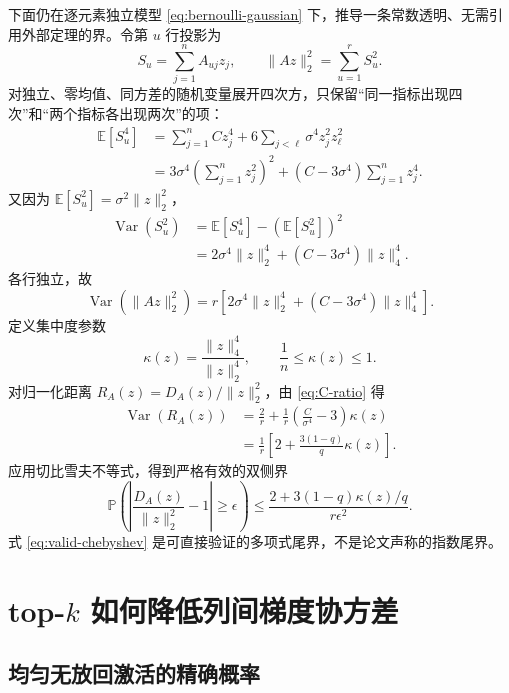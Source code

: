 \documentclass[11pt]{article}
\numberwithin{equation}{section}
\newcommand{\E}{\mathbb{E}}
\newcommand{\Pp}{\mathbb{P}}
\newcommand{\1}{\mathbf{1}}
\newcommand{\Var}{\operatorname{Var}}
\begin{document}
下面仍在逐元素独立模型 \eqref{eq:bernoulli-gaussian} 下，推导一条常数透明、无需引用外部定理的界。令第 $u$ 行投影为
\begin{equation}
  S_u=\sum_{j=1}^{n}A_{uj}z_j,
  \qquad
  \|Az\|_2^2=\sum_{u=1}^{r}S_u^2.
\end{equation}
对独立、零均值、同方差的随机变量展开四次方，只保留“同一指标出现四次”和“两个指标各出现两次”的项：
\begin{align}
  \E[S_u^4]
  &=\sum_{j=1}^{n}Cz_j^4
    +6\sum_{j<\ell}\sigma^4z_j^2z_\ell^2\\
  &=3\sigma^4\left(\sum_{j=1}^{n}z_j^2\right)^2
    +(C-3\sigma^4)\sum_{j=1}^{n}z_j^4.
  \label{eq:row-fourth}
\end{align}
又因为 $\E[S_u^2]=\sigma^2\|z\|_2^2$，
\begin{align}
  \Var(S_u^2)
  &=\E[S_u^4]-(\E[S_u^2])^2\\
  &=2\sigma^4\|z\|_2^4
   +(C-3\sigma^4)\|z\|_4^4.
\end{align}
各行独立，故
\begin{equation}
  \Var(\|Az\|_2^2)
  =r\left[
    2\sigma^4\|z\|_2^4
    +(C-3\sigma^4)\|z\|_4^4
  \right].
\end{equation}
定义集中度参数
\begin{equation}
  \kappa(z)=\frac{\|z\|_4^4}{\|z\|_2^4},
  \qquad
  \frac1n\le\kappa(z)\le1.
\end{equation}
对归一化距离 $R_A(z)=D_A(z)/\|z\|_2^2$，由 \eqref{eq:C-ratio} 得
\begin{align}
  \Var(R_A(z))
  &=\frac{2}{r}
    +\frac1r\left(\frac C{\sigma^4}-3\right)\kappa(z)\\
  &=\frac1r\left[2+\frac{3(1-q)}q\kappa(z)\right].
  \label{eq:normalized-variance}
\end{align}
应用切比雪夫不等式，得到严格有效的双侧界
\begin{equation}
  \boxed{
  \Pp\left(
  \left|\frac{D_A(z)}{\|z\|_2^2}-1\right|\ge\epsilon
  \right)
  \le
  \frac{2+3(1-q)\kappa(z)/q}{r\epsilon^2}.}
  \label{eq:valid-chebyshev}
\end{equation}
式 \eqref{eq:valid-chebyshev} 是可直接验证的多项式尾界，不是论文声称的指数尾界。

\section{top-$k$ 如何降低列间梯度协方差}

\subsection{均匀无放回激活的精确概率}
\end{document}

